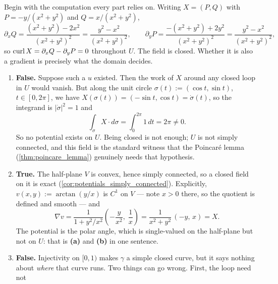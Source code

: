 \begin{exercisesolution}
\label{sol:angle_field_true_false}
Begin with the computation every part relies on. Writing $X = (P,Q)$ with $P = -y/(x^2+y^2)$ and
$Q = x/(x^2+y^2)$,
\[\partial_x Q = \frac{(x^2+y^2) - 2x^2}{(x^2+y^2)^2} = \frac{y^2-x^2}{(x^2+y^2)^2},
  \qquad
  \partial_y P = \frac{-(x^2+y^2) + 2y^2}{(x^2+y^2)^2} = \frac{y^2-x^2}{(x^2+y^2)^2},\]
so $\operatorname{curl} X = \partial_x Q - \partial_y P = 0$ throughout $U$. The field is closed. Whether it is
also a gradient is precisely what the domain decides.
\begin{enumerate}[label=\textbf{(\alph*)}]
  \item \textbf{False.} Suppose such a $u$ existed. Then the work of $X$ around any closed loop in
    $U$ would vanish. But along the unit circle $\sigma(t) := (\cos t, \sin t)$, $t \in [0,2\pi]$,
    we have $X(\sigma(t)) = (-\sin t, \cos t) = \dot\sigma(t)$, so the integrand is
    $\lvert\dot\sigma\rvert^2 = 1$ and
\[\int_\sigma X \cdot d\sigma = \int_0^{2\pi} 1 \, dt = 2\pi \neq 0 .\]
    So no potential exists on $U$. Being closed is not enough; $U$ is not simply connected, and this
    field is the standard witness that the Poincaré lemma (\cref{thm:poincare_lemma}) genuinely needs
    that hypothesis.
  \item \textbf{True.} The half-plane $V$ is convex, hence simply connected, so a closed field on it
    is exact (\cref{cor:potentials_simply_connected}). Explicitly, $v(x,y) := \arctan(y/x)$ is $C^1$
    on $V$ --- note $x > 0$ there, so the quotient is defined and smooth --- and
\[\nabla v = \frac{1}{1 + y^2/x^2}\left(-\frac{y}{x^2},\; \frac{1}{x}\right)
   = \frac{1}{x^2+y^2}\,(-y,\, x) = X .\]
    The potential is the polar angle, which is single-valued on the half-plane but not on $U$: that
    is \textbf{(a)} and \textbf{(b)} in one sentence.
  \item \textbf{False.} Injectivity on $[0,1)$ makes $\gamma$ a simple closed curve, but it says
    nothing about \emph{where} that curve runs. Two things can go wrong. First, the loop need not

\end{enumerate}
\end{exercisesolution}
